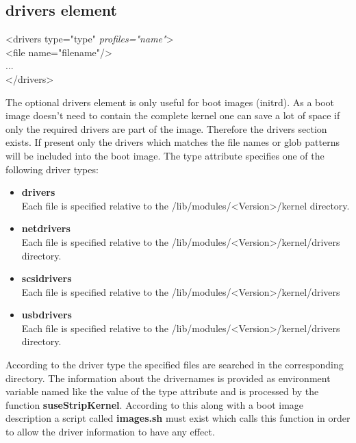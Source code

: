 \subsection{drivers element}
\begin{Command}{12cm}
<drivers type="type" \textit{profiles="name"}>\\
\hspace*{1cm}<file name="filename"/>\\
\hspace*{1cm}...\\
</drivers>
\end{Command}

The optional drivers element is only useful for boot images (initrd).
As a boot image doesn't need to contain the complete kernel one can
save a lot of space if only the required drivers are part of the image.
Therefore the drivers section exists. If present only the drivers which
matches the file names or glob patterns will be included into the
boot image. The type attribute specifies one of the following driver
types:

\begin{itemize}
\item \textbf{drivers}\\
      Each file is specified relative to the
      /lib/modules/<Version>/kernel directory.
\item \textbf{netdrivers}\\
      Each file is specified relative to the
      /lib/modules/<Version>/kernel/drivers
      directory.
\item \textbf{scsidrivers}\\
      Each file is specified relative to the
      /lib/modules/<Version>/kernel/drivers
\item \textbf{usbdrivers}\\
      Each file is specified relative to the
      /lib/modules/<Version>/kernel/drivers directory.
\end{itemize}

According to the driver type the specified files are searched in
the corresponding directory. The information about the drivernames
is provided as environment variable named like the value of
the type attribute and is processed by the function
\textbf{suseStripKernel}. According to this along with a boot image
description a script called \textbf{images.sh} must exist which
calls this function in order to allow the driver information to
have any effect.



